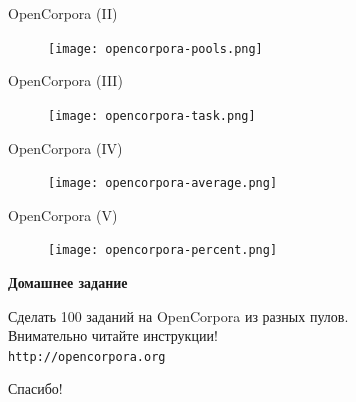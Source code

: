 \documentclass{beamer}
\begin{document}
\begin{frame}{OpenCorpora (II)}
\begin{center}
	\begin{figure}[H]
		\texttt{[image: opencorpora-pools.png]} 
	\end{figure}
\end{center}
\end{frame}

\begin{frame}{OpenCorpora (III)}
\begin{center}
	\begin{figure}[H]
		\texttt{[image: opencorpora-task.png]} 
	\end{figure}
\end{center}
\end{frame}

\begin{frame}{OpenCorpora (IV)}
\begin{center}
	\begin{figure}[H]
		\texttt{[image: opencorpora-average.png]} 
	\end{figure}
\end{center}
\end{frame}

\begin{frame}{OpenCorpora (V)}
\begin{center}
	\begin{figure}[H]
		\texttt{[image: opencorpora-percent.png]} 
	\end{figure}
\end{center}
\end{frame}


\begin{frame}{}
\begin{center}
	\textbf{Домашнее задание}
\end{center}
\end{frame}

\begin{frame}{}
\begin{center}
Сделать 100 заданий на OpenCorpora из разных пулов.\\
\medskip
Внимательно читайте инструкции!\\
\medskip
\texttt{http://opencorpora.org}
\end{center}
\end{frame}

\begin{frame}{}
    \thispagestyle{empty}
    \begin{center}
        {\large Спасибо!}
    \end{center}
\end{frame}
\end{document}
